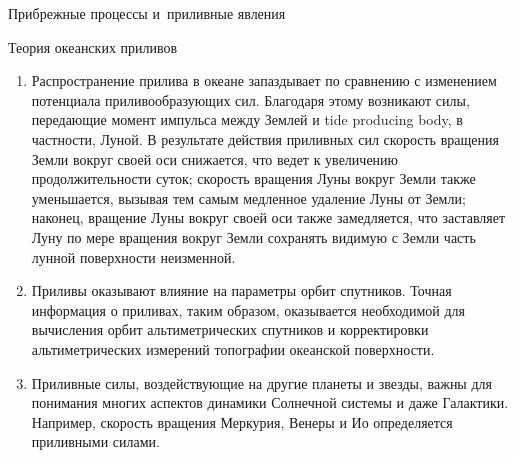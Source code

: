 \begin{chapter}{Прибрежные процессы и~приливные явления}
\begin{section}{Теория океанских приливов}
\begin{enumerate}
\item 
Распространение прилива в океане запаздывает по сравнению с изменением
потенциала приливообразующих сил. Благодаря этому возникают силы, передающие
момент импульса между Землей и tide produc\-ing body, в частности, 
Луной. В результате действия приливных сил скорость вращения Земли
вокруг своей оси снижается, что ведет к увеличению продолжительности суток;
скорость вращения Луны вокруг Земли также уменьшается, вызывая тем самым
медленное удаление Луны от Земли; наконец, вращение Луны вокруг своей оси
также замедляется, что заставляет Луну по мере вращения вокруг Земли сохранять
видимую с Земли часть лунной поверхности неизменной.
%

\item 
Приливы оказывают влияние на параметры орбит спутников. Точная информация
о приливах, таким образом, оказывается необходимой для вычисления орбит
альтиметрических спутников и корректировки альтиметрических измерений
топографии океанской поверхности.
%

\item
Приливные силы, воздействующие на другие планеты и звезды, важны для понимания
многих аспектов динамики Солнечной системы и даже Галактики. Например,
скорость вращения Меркурия, Венеры и Ио определяется приливными силами.
%
\end{enumerate}


\end{section}
\end{chapter}
